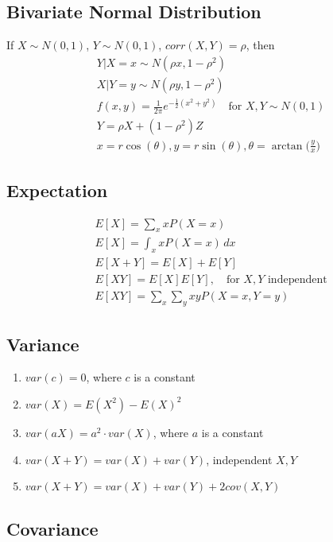 \documentclass[11pt, twocolumn]{article}
\theoremstyle{definition}
\begin{document}
\subsection*{Bivariate Normal Distribution}
If $X \sim N(0,1)$, $Y\sim N(0,1)$, $corr(X,Y)=\rho$, then
\begin{align*}
	&Y|X=x \sim N(\rho x, 1-\rho ^2)\\
	&X|Y=y \sim N(\rho y, 1-\rho ^2)\\
	&f(x,y)=\frac{1}{2\pi}e^{      -\frac{1}{2} (x^2+y^2) } \quad \text{for }X,Y \sim N(0,1) \\
	&Y=\rho X + (1- \rho^2)Z\\
	&x=r\cos(\theta), y=r\sin(\theta), \theta=\arctan\bigg (\frac{y}{x} \bigg)
\end{align*}



\subsection*{Expectation} \vspace{-.1cm}
\begin{align*}
&E[X]=\sum_{x} x P(X=x)\\
&E[X]=\int_{x} x P(X=x) \, dx\\
&E[X+Y]=E[X]+E[Y]\\
&E[XY]=E[X]E[Y], \quad \text{for } X,Y \text{ independent}\\
&E[XY]=\sum_{x} \sum_{y} xyP(X=x,Y=y)
\end{align*}




\subsection*{Variance}
\begin{enumerate}
\item $var(c)=0$, where $c$ is a constant 
\item $var(X)=E(X^2)-E(X)^2$ 
\item $var(aX)=a^2\cdot var(X)$, where $a$ is a constant 
\item $var(X+Y)=var(X)+var(Y)$, independent $X,Y$
\item $var(X+Y)=var(X)+var(Y)+2cov(X,Y)$
\end{enumerate}



\subsection*{Covariance}
\end{document}
